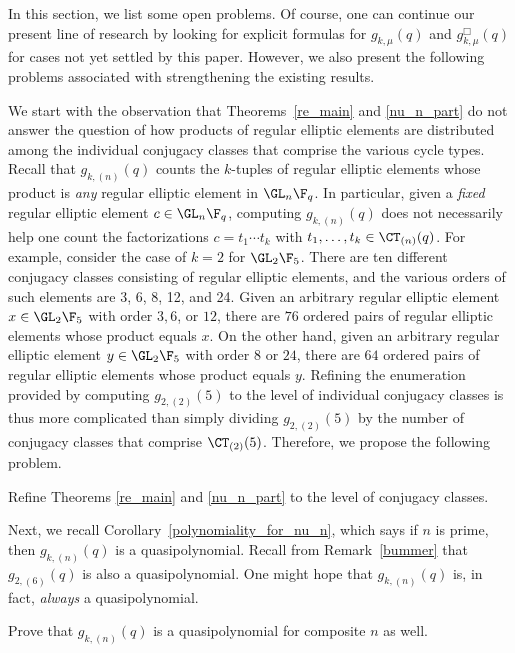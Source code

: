 In this section, we list some open problems.
Of course, one can continue our present line of research by looking for explicit formulas for \(g_{k,\mu} (q)\) and \(g_{k,\mu}^\Box (q)\) for cases not yet settled by this paper.
However, we also present the following problems associated with strengthening the existing results.

We start with the observation that Theorems~\ref{re_main} and \ref{nu_n_part} do not answer the question of how products of regular elliptic elements are distributed among the individual conjugacy classes that comprise the various cycle types.
Recall that \(g_{k,(n)} (q)\) counts the \(k\)-tuples of regular elliptic elements whose product is \emph{any} regular elliptic element in \(\GL_n \F_q\).
In particular, given a \emph{fixed} regular elliptic element \(c \in \GL_n \F_q\), computing \(g_{k,(n)} (q)\) does not necessarily help one count the factorizations \(c = t_1 \cdots t_k\) with \(t_1,\ldots,t_k \in \CT_{(n)} (q)\).
For example, consider the case of \(k=2\) for \(\GL_2 \F_5\).
There are ten different conjugacy classes consisting of regular elliptic elements, and the various orders of such elements are 3, 6, 8, 12, and 24.
Given an arbitrary regular elliptic element \(x \in \GL_2 \F_5\) with order \(3, 6\), or \(12\), there are \(76\) ordered pairs of regular elliptic elements whose product equals \(x\).
On the other hand,
given an arbitrary regular elliptic element \(y \in \GL_2 \F_5\) with order \(8\) or \(24\), there are \(64\) ordered pairs of regular elliptic elements whose product equals \(y\).
Refining the enumeration provided by computing \(g_{2,(2)} (5)\) to the level of individual conjugacy classes is thus more complicated than simply dividing \(g_{2,(2)} (5)\) by the number of conjugacy classes that comprise \(\CT_{(2)} (5)\).
Therefore, we propose the following problem.

\begin{problem}
Refine Theorems \ref{re_main} and \ref{nu_n_part} to the level of conjugacy classes.
\end{problem}


Next, we recall Corollary~\ref{polynomiality_for_nu_n}, which says if \(n\) is prime, then \(g_{k,(n)} (q)\) is a quasipolynomial.
Recall from Remark~\ref{bummer} that \(g_{2,(6)} (q)\) is also a quasipolynomial.
One might hope that \(g_{k,(n)}(q)\) is, in fact, \emph{always} a quasipolynomial.

\begin{problem}
\label{prob:quasipoly}
Prove that \(g_{k,(n)} (q)\) is a quasipolynomial for composite \(n\) as well.
\end{problem}


